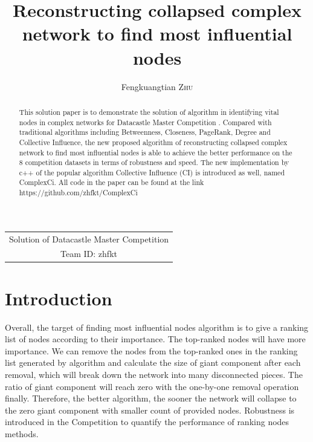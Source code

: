 \documentclass{article}
\title{ Reconstructing collapsed complex network to find most influential nodes  } %
\author{Fengkuangtian \textsc{Zhu}} %
\begin{document}
	
	\maketitle %
	
	
	
	\begin{center}
		\begin{tabular}{c}
			Solution of Datacastle Master Competition	\\
			Team ID: zhfkt 
		\end{tabular}
	\end{center}
	
	\begin{abstract}
		This solution paper is to demonstrate the solution of algorithm in identifying vital nodes in complex networks for Datacastle Master Competition . Compared with traditional algorithms including Betweenness\cite{wikiBetweennesscentrality}, Closeness\cite{wikiClosenesscentrality}, PageRank\cite{wikiPageRank}, Degree\cite{wikiCentrality} and Collective Influence\cite{morone2015influence}\cite{morone2016collective}, the new proposed algorithm of reconstructing collapsed complex network to find most influential nodes is able to achieve the better performance on the 8 competition datasets in terms of robustness\cite{schneider2011mitigation} and speed. The new implementation by c++ of the popular algorithm Collective Influence (CI) is introduced as well, named ComplexCi. All code in the paper can be found at the link https://github.com/zhfkt/ComplexCi \cite{zhfktgithub} \cite{zhfkt2017887989}
	\end{abstract}

	\section{Introduction}


	Overall, the target of finding most influential nodes algorithm is to give a ranking list of nodes according to their importance. The top-ranked nodes will have more importance. We can remove the nodes from the top-ranked ones in the ranking list generated by algorithm and calculate the size of giant component after each removal, which will break down the network into many disconnected pieces. The ratio of giant component will reach zero with the one-by-one removal operation finally. Therefore, the better algorithm, the sooner the network will collapse to the zero giant component with smaller count of provided nodes. Robustness \cite{schneider2011mitigation} is introduced in the Competition to quantify the performance of ranking nodes methods. 
	
\end{document}
